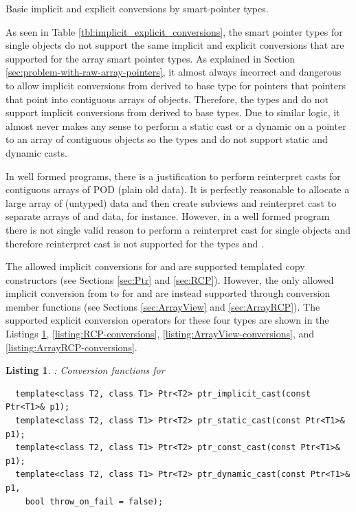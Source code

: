 \documentclass[pdf,ps2pdf,11pt]{SANDreport}
\newtheorem{listing}{Listing}
\begin{document}
\begin{table}
\begin{center}

\end{center}
\caption{\label{tbl:implicit_explicit_conversions}
Basic implicit and explicit conversions by smart-pointer types.}
\end{table}


As seen in Table {}\ref{tbl:implicit_explicit_conversions}, the smart
pointer types for single objects do not support the same implicit and
explicit conversions that are supported for the array smart pointer
types.  As explained in Section
{}\ref{sec:problem-with-raw-array-pointers}, it almost always
incorrect and dangerous to allow implicit conversions from derived to
base type for pointers that pointers that point into contiguous arrays
of objects.  Therefore, the types {} and
{} do not support implicit conversions from derived to
base types.  Due to similar logic, it almost never makes any sense to
perform a static cast or a dynamic on a pointer to an array of
contiguous objects so the types {} and {}
do not support static and dynamic casts.

In well formed programs, there is a justification to perform
reinterpret casts for contiguous arrays of POD (plain old data). It is
perfectly reasonable to allocate a large array of {}
(untyped) data and then create subviews and reinterpret cast to
separate arrays of {} and {} data, for instance.
However, in a well formed program there is not single valid reason to
perform a reinterpret cast for single objects and therefore
reinterpret cast is not supported for the types {} and
{}.

The allowed implicit conversions for {} and {} are
supported templated copy constructors (see Sections {}\ref{sec:Ptr}
and {}\ref{sec:RCP}).  However, the only allowed implicit conversion
from {} to {} for {} and
{} are instead supported through conversion member
functions (see Sections {}\ref{sec:ArrayView} and
{}\ref{sec:ArrayRCP}).  The supported explicit conversion operators
for these four types are shown in the Listings
{}\ref{listing:Ptr-conversions}, {}\ref{listing:RCP-conversions},
{}\ref{listing:ArrayView-conversions}, and
{}\ref{listing:ArrayRCP-conversions}.


{}\begin{listing}: Conversion functions for {}
\label{listing:Ptr-conversions}
{\small\begin{verbatim}
  template<class T2, class T1> Ptr<T2> ptr_implicit_cast(const Ptr<T1>& p1);
  template<class T2, class T1> Ptr<T2> ptr_static_cast(const Ptr<T1>& p1);
  template<class T2, class T1> Ptr<T2> ptr_const_cast(const Ptr<T1>& p1);
  template<class T2, class T1> Ptr<T2> ptr_dynamic_cast(const Ptr<T1>& p1,
    bool throw_on_fail = false);
\end{verbatim}}
\end{listing}
\end{document}
